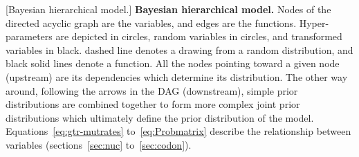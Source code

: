 \documentclass{article}
\begin{document}
\begin{center}
        [Bayesian hierarchical model.]{
    \textbf{Bayesian hierarchical model.} Nodes of the directed acyclic graph are the variables, and edges are the functions.
    Hyper-parameters are depicted in {\color{RED}{red}} circles, random variables in {\color{BLUE}{blue}} circles, and transformed variables in black.
    {\color{BLUE}{Blue}} dashed line denotes a drawing from a random distribution, and black solid lines denote a function.
    All the nodes pointing toward a given node (upstream) are its dependencies which determine its distribution.
    The other way around, following the arrows in the DAG (downstream), simple {prior} distributions are combined together to form more complex joint {prior} distributions which ultimately define the {prior} distribution of the model.
    Equations~\ref{eq:gtr-mutrates} to~\ref{eq:Probmatrix} describe the relationship between variables (sections~\ref{sec:nuc} to~\ref{sec:codon}).
    \label{mutsel-illustration}}
    \end{center}
\end{document}
